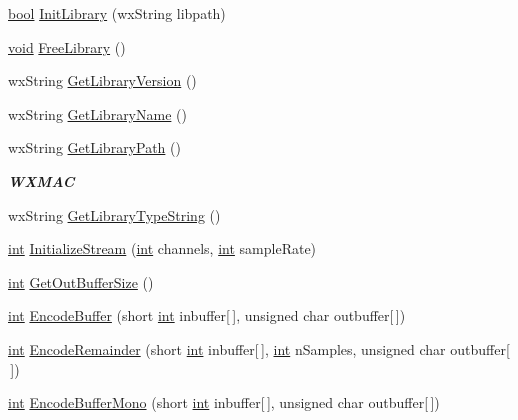 \begin{DoxyCompactItemize}
\hyperlink{mac_2config_2i386_2lib-src_2libsoxr_2soxr-config_8h_abb452686968e48b67397da5f97445f5b}{bool} \hyperlink{class_m_p3_exporter_aa34bec5911154af60e5d41f47334494a}{Init\+Library} (wx\+String libpath)
\item 
\hyperlink{sound_8c_ae35f5844602719cf66324f4de2a658b3}{void} \hyperlink{class_m_p3_exporter_a6af5ef82eedd68c7f8358d3c49a75159}{Free\+Library} ()
\item 
wx\+String \hyperlink{class_m_p3_exporter_a186ea8c4d946307f3920c0b7799c2510}{Get\+Library\+Version} ()
\item 
wx\+String \hyperlink{class_m_p3_exporter_a9b4b87f0beb590a717a0d25463056662}{Get\+Library\+Name} ()
\item 
wx\+String \hyperlink{class_m_p3_exporter_aaaad98c5e78d737a908fdb1f8e4307e1}{Get\+Library\+Path} ()
\begin{DoxyCompactList}\small\item\em {\bfseries W\+X\+M\+AC} \end{DoxyCompactList}\item 
wx\+String \hyperlink{class_m_p3_exporter_a6f18bf023d8aa905dda9478a2ba9d8ea}{Get\+Library\+Type\+String} ()
\item 
\hyperlink{xmltok_8h_a5a0d4a5641ce434f1d23533f2b2e6653}{int} \hyperlink{class_m_p3_exporter_ab10034c07fdc6dc11d7f5c3cf1aecfce}{Initialize\+Stream} (\hyperlink{xmltok_8h_a5a0d4a5641ce434f1d23533f2b2e6653}{int} channels, \hyperlink{xmltok_8h_a5a0d4a5641ce434f1d23533f2b2e6653}{int} sample\+Rate)
\item 
\hyperlink{xmltok_8h_a5a0d4a5641ce434f1d23533f2b2e6653}{int} \hyperlink{class_m_p3_exporter_a28002b16e68620d80b5be39c683683c1}{Get\+Out\+Buffer\+Size} ()
\item 
\hyperlink{xmltok_8h_a5a0d4a5641ce434f1d23533f2b2e6653}{int} \hyperlink{class_m_p3_exporter_a2dfc6ba9ca9a588e0fd7939a035c4b5e}{Encode\+Buffer} (short \hyperlink{xmltok_8h_a5a0d4a5641ce434f1d23533f2b2e6653}{int} inbuffer\mbox{[}$\,$\mbox{]}, unsigned char outbuffer\mbox{[}$\,$\mbox{]})
\item 
\hyperlink{xmltok_8h_a5a0d4a5641ce434f1d23533f2b2e6653}{int} \hyperlink{class_m_p3_exporter_a1cbc15a2e0703af568f83a0628be9559}{Encode\+Remainder} (short \hyperlink{xmltok_8h_a5a0d4a5641ce434f1d23533f2b2e6653}{int} inbuffer\mbox{[}$\,$\mbox{]}, \hyperlink{xmltok_8h_a5a0d4a5641ce434f1d23533f2b2e6653}{int} n\+Samples, unsigned char outbuffer\mbox{[}$\,$\mbox{]})
\item 
\hyperlink{xmltok_8h_a5a0d4a5641ce434f1d23533f2b2e6653}{int} \hyperlink{class_m_p3_exporter_a6265a7bfea3aa92583bf7fc1b5f5189d}{Encode\+Buffer\+Mono} (short \hyperlink{xmltok_8h_a5a0d4a5641ce434f1d23533f2b2e6653}{int} inbuffer\mbox{[}$\,$\mbox{]}, unsigned char outbuffer\mbox{[}$\,$\mbox{]})

\end{DoxyCompactItemize}
